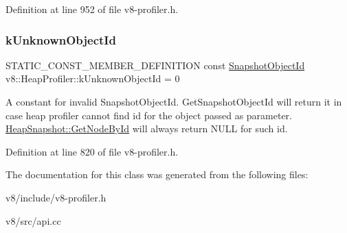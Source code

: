 Definition at line 952 of file v8-\/profiler.\+h.

\mbox{\label{classv8_1_1HeapProfiler_a40f41d75716ff1b335e95521296e027d}} 
\subsubsection{\texorpdfstring{k\+Unknown\+Object\+Id}{kUnknownObjectId}}
{\footnotesize\ttfamily S\+T\+A\+T\+I\+C\+\_\+\+C\+O\+N\+S\+T\+\_\+\+M\+E\+M\+B\+E\+R\+\_\+\+D\+E\+F\+I\+N\+I\+T\+I\+ON const \mbox{\hyperlink{classuint32__t}{Snapshot\+Object\+Id}} v8\+::\+Heap\+Profiler\+::k\+Unknown\+Object\+Id = 0\hspace{0.3cm}{\ttfamily [static]}}

A constant for invalid Snapshot\+Object\+Id. Get\+Snapshot\+Object\+Id will return it in case heap profiler cannot find id for the object passed as parameter. \mbox{\hyperlink{classv8_1_1HeapSnapshot_a17777c4ef00f142ef176b54f433e2d44}{Heap\+Snapshot\+::\+Get\+Node\+By\+Id}} will always return N\+U\+LL for such id. 

Definition at line 820 of file v8-\/profiler.\+h.



The documentation for this class was generated from the following files\+:\begin{DoxyCompactItemize}
\item 
v8/include/v8-\/profiler.\+h\item 
v8/src/api.\+cc\end{DoxyCompactItemize}
